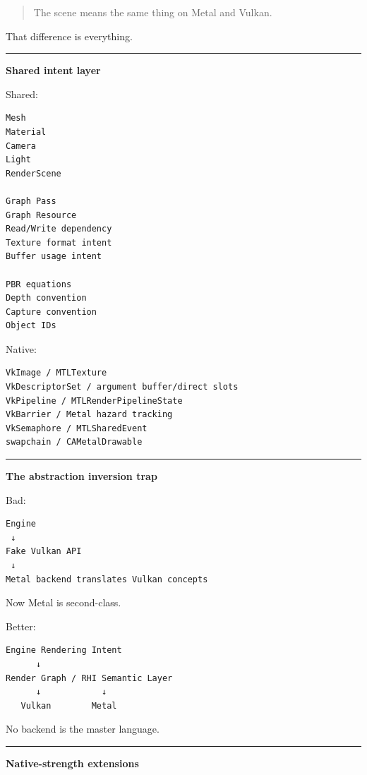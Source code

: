\begin{quote}
The scene means the same thing on Metal and Vulkan.
\end{quote}

That difference is everything.

\begin{center}\rule{0.5\linewidth}{0.5pt}\end{center}

\textbf{Shared intent layer}

Shared:

\begin{verbatim}
Mesh
Material
Camera
Light
RenderScene

Graph Pass
Graph Resource
Read/Write dependency
Texture format intent
Buffer usage intent

PBR equations
Depth convention
Capture convention
Object IDs
\end{verbatim}

Native:

\begin{verbatim}
VkImage / MTLTexture
VkDescriptorSet / argument buffer/direct slots
VkPipeline / MTLRenderPipelineState
VkBarrier / Metal hazard tracking
VkSemaphore / MTLSharedEvent
swapchain / CAMetalDrawable
\end{verbatim}

\begin{center}\rule{0.5\linewidth}{0.5pt}\end{center}

\textbf{The abstraction inversion trap}

Bad:

\begin{verbatim}
Engine
 ↓
Fake Vulkan API
 ↓
Metal backend translates Vulkan concepts
\end{verbatim}

Now Metal is second-class.

Better:

\begin{verbatim}
Engine Rendering Intent
      ↓
Render Graph / RHI Semantic Layer
      ↓            ↓
   Vulkan        Metal
\end{verbatim}

No backend is the master language.

\begin{center}\rule{0.5\linewidth}{0.5pt}\end{center}

\textbf{Native-strength extensions}

